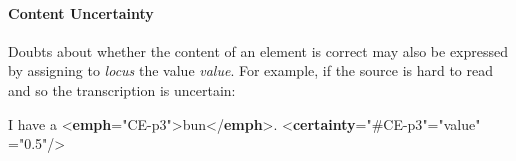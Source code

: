 \paragraph[{Content Uncertainty}]{Content Uncertainty}\par
Doubts about whether the content of an element is correct may also be expressed by assigning to {\itshape locus} the value \textit{value}. For example, if the source is hard to read and so the transcription is uncertain: \par\bgroup{}\exampleFont \begin{shaded}\noindent\mbox{}I have a {<\textbf{emph}\hspace*{1em}{xml:id}="{CE-p3}">}bun{</\textbf{emph}>}.\mbox{}\newline 
\mbox{}\newline 
{<\textbf{certainty}\hspace*{1em}{target}="{\#CE-p3}"\hspace*{1em}{locus}="{value}"\mbox{}\newline 
\hspace*{1em}{degree}="{0.5}"/>}\end{shaded}\egroup\par \par
